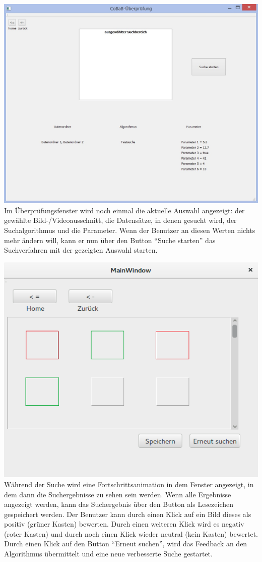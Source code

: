 \includegraphics[width=1\linewidth]{img/Ueberpruefung}
Im Überprüfungsfenster wird noch einmal die aktuelle Auswahl angezeigt: der gewählte Bild-/Videoausschnitt, die Datensätze, in denen gesucht wird, der Suchalgorithmus und die Parameter. Wenn der Benutzer an diesen Werten nichts mehr ändern will, kann er nun über den Button \enquote{Suche starten} das Suchverfahren mit der gezeigten Auswahl starten.

\includegraphics[width=1\linewidth]{img/Suchergebnisse}
Während der Suche wird eine Fortschrittsanimation in dem Fenster angezeigt, in dem dann die Suchergebnisse zu sehen sein werden. Wenn alle Ergebnisse angezeigt werden, kann das Suchergebnis über den Button als Lesezeichen gespeichert werden.\newline 
Der Benutzer kann durch einen Klick auf ein Bild dieses als positiv (grüner Kasten) bewerten. Durch einen weiteren Klick wird es negativ (roter Kasten) und durch noch einen Klick wieder neutral (kein Kasten) bewertet. Durch einen Klick auf den Button \enquote{Erneut suchen}, wird das Feedback an den Algorithmus übermittelt und eine neue verbesserte Suche gestartet.
\pagebreak
